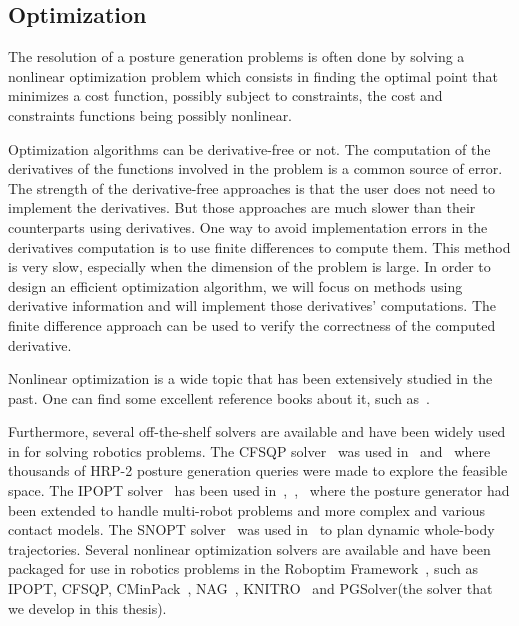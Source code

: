 \subsection{Optimization}
\label{sub:optimization}

The resolution of a posture generation problems is often done by solving a nonlinear optimization problem which consists in finding the optimal point that minimizes a cost function, possibly subject to constraints, the cost and constraints functions being possibly nonlinear.

Optimization algorithms can be derivative-free or not.
The computation of the derivatives of the functions involved in the problem is a common source of error.
The strength of the derivative-free approaches is that the user does not need to implement the derivatives.
But those approaches are much slower than their counterparts using derivatives.
One way to avoid implementation errors in the derivatives computation is to use finite differences to compute them.
This method is very slow, especially when the dimension of the problem is large.
In order to design an efficient optimization algorithm, we will focus on methods using derivative information and will implement those derivatives' computations.
The finite difference approach can be used to verify the correctness of the computed derivative.

Nonlinear optimization is a wide topic that has been extensively studied in the past.
One can find some excellent reference books about it, such as~\cite{nocedal:book:2006, bonnans:book:2003, boyd2004convex}.

Furthermore, several off-the-shelf solvers are available and have been widely used in for solving robotics problems.
The CFSQP solver~\cite{cfsqp:manual} was used in~\cite{escande:iros:2009} and~\cite{escande:ras:2013} where thousands of HRP-2 posture generation queries were made to explore the feasible space.
The IPOPT solver~\cite{wachter:mathprog:2006} has been used in~\cite{vaillant:humanoids:2014},~\cite{vaillant:autonomousrobots:2016},~\cite{bouyarmane:ar:2012} where the posture generator had been extended to handle multi-robot problems and more complex and various contact models.
The SNOPT solver~\cite{gill2005snopt} was used in~\cite{dai2014whole} to plan dynamic whole-body trajectories.
Several nonlinear optimization solvers are available and have been packaged for use in robotics problems in the Roboptim Framework~\cite{moulard:jsme:2013}, such as IPOPT, CFSQP, CMinPack~\cite{cminpack}, NAG~\cite{nag}, KNITRO~\cite{knitro} and PGSolver(the solver that we develop in this thesis).

